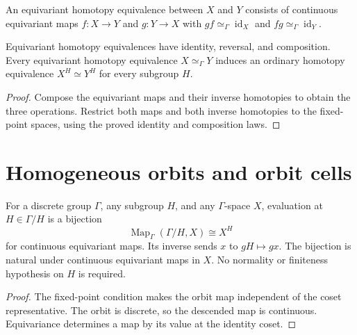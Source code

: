 \begin{definition}\label{def:equivariant-homotopy-equivalence}
\leanok
An equivariant homotopy equivalence between $X$ and $Y$ consists of
continuous equivariant maps $f:X\to Y$ and $g:Y\to X$ with
$gf\simeq_\Gamma\operatorname{id}_X$ and
$fg\simeq_\Gamma\operatorname{id}_Y$.
\end{definition}

\begin{proposition}\label{prop:fixed-point-homotopy-equivalence}
Equivariant homotopy equivalences have identity, reversal, and composition.
Every equivariant homotopy equivalence $X\simeq_\Gamma Y$ induces an
ordinary homotopy equivalence $X^H\simeq Y^H$ for every subgroup $H$.
\end{proposition}
\begin{proof}
\leanok
Compose the equivariant maps and their inverse homotopies to obtain the
three operations. Restrict both maps and both inverse homotopies to the
fixed-point spaces, using the proved identity and composition laws.
\end{proof}

\section{Homogeneous orbits and orbit cells}

\begin{proposition}\label{prop:orbit-fixed-point-correspondence}
For a discrete group $\Gamma$, any subgroup $H$, and any $\Gamma$-space $X$,
evaluation at $H\in\Gamma/H$ is a bijection
\[
 \operatorname{Map}_\Gamma(\Gamma/H,X)\cong X^H
\]
for continuous equivariant maps. Its inverse sends $x$ to $gH\mapsto gx$.
The bijection is natural under continuous equivariant maps in $X$.
No normality or finiteness hypothesis on $H$ is required.
\end{proposition}
\begin{proof}
\leanok
The fixed-point condition makes the orbit map independent of the coset
representative. The orbit is discrete, so the descended map is continuous.
Equivariance determines a map by its value at the identity coset.
\end{proof}

